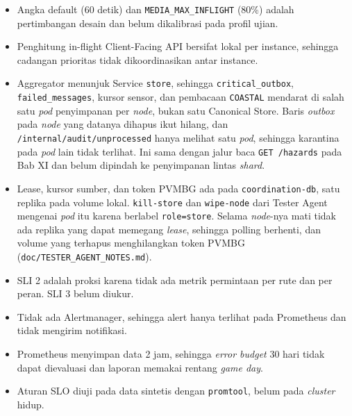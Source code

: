 \begin{itemize}
\tightlist
\item
  Angka default  (60 detik) dan \texttt{MEDIA\_MAX\_INFLIGHT} (80\%) adalah pertimbangan desain dan belum dikalibrasi pada profil ujian.
\item
  Penghitung in-flight Client-Facing API bersifat lokal per instance, sehingga cadangan prioritas tidak dikoordinasikan antar instance.
\item
   Aggregator menunjuk Service \texttt{store}, sehingga \texttt{critical\_outbox}, \texttt{failed\_messages}, kursor sensor, dan pembacaan \texttt{COASTAL} mendarat di salah satu \textit{pod} penyimpanan per \textit{node}, bukan satu Canonical Store. Baris \textit{outbox} pada \textit{node} yang datanya dihapus ikut hilang, dan \texttt{/internal/audit/unprocessed} hanya melihat satu \textit{pod}, sehingga karantina pada \textit{pod} lain tidak terlihat. Ini sama dengan jalur baca \texttt{GET /hazards} pada Bab XI dan belum dipindah ke penyimpanan lintas \textit{shard}.
\item
  Lease, kursor sumber, dan token PVMBG ada pada \texttt{coordination-db}, satu replika pada volume lokal. \texttt{kill-store} dan \texttt{wipe-node} dari Tester Agent mengenai \textit{pod} itu karena berlabel \texttt{role=store}. Selama \textit{node}-nya mati tidak ada replika yang dapat memegang \textit{lease}, sehingga polling berhenti, dan volume yang terhapus menghilangkan token PVMBG (\texttt{doc/TESTER\_AGENT\_NOTES.md}).
\item
  SLI 2 adalah proksi karena tidak ada metrik permintaan per rute dan per peran. SLI 3 belum diukur.
\item
  Tidak ada Alertmanager, sehingga alert hanya terlihat pada Prometheus dan tidak mengirim notifikasi.
\item
  Prometheus menyimpan data 2 jam, sehingga \textit{error budget} 30 hari tidak dapat dievaluasi dan laporan memakai rentang \textit{game day}.
\item
  Aturan SLO diuji pada data sintetis dengan \texttt{promtool}, belum pada \textit{cluster} hidup.
\end{itemize}
